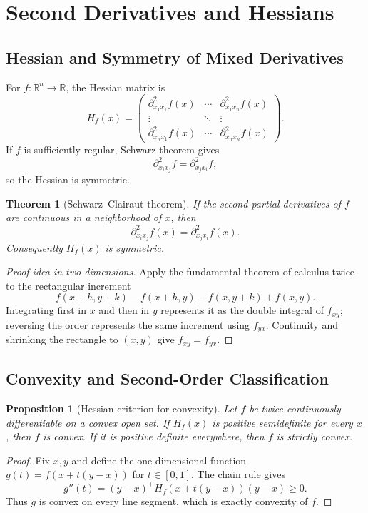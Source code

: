 \documentclass[11pt]{article}
\newcommand{\R}{\mathbb{R}}
\theoremstyle{definition}
\theoremstyle{plain}
\newtheorem{theorem}[definition]{Theorem}
\newtheorem{proposition}[definition]{Proposition}
\theoremstyle{remark}
\begin{document}
\section{Second Derivatives and Hessians}

\subsection{Hessian and Symmetry of Mixed Derivatives}

For $f:\R^n\to\R$, the Hessian matrix is
\[
H_f(x)=
\begin{pmatrix}
\partial_{x_1x_1}^2f(x)&\cdots&\partial_{x_1x_n}^2f(x)\\
\vdots&\ddots&\vdots\\
\partial_{x_nx_1}^2f(x)&\cdots&\partial_{x_nx_n}^2f(x)
\end{pmatrix}.
\]
If $f$ is sufficiently regular, Schwarz theorem gives
\[
\partial_{x_ix_j}^2f=\partial_{x_jx_i}^2f,
\]
so the Hessian is symmetric.

\begin{theorem}[Schwarz--Clairaut theorem]
If the second partial derivatives of $f$ are continuous in a neighborhood of
$x$, then
\[
\partial_{x_ix_j}^2f(x)=\partial_{x_jx_i}^2f(x).
\]
Consequently $H_f(x)$ is symmetric.
\end{theorem}

\begin{proof}[Proof idea in two dimensions]
Apply the fundamental theorem of calculus twice to the rectangular increment
\[
f(x+h,y+k)-f(x+h,y)-f(x,y+k)+f(x,y).
\]
Integrating first in $x$ and then in $y$ represents it as the double integral
of $f_{xy}$; reversing the order represents the same increment using $f_{yx}$.
Continuity and shrinking the rectangle to $(x,y)$ give $f_{xy}=f_{yx}$.
\end{proof}

\subsection{Convexity and Second-Order Classification}

\begin{proposition}[Hessian criterion for convexity]
Let $f$ be twice continuously differentiable on a convex open set. If
$H_f(x)$ is positive semidefinite for every $x$, then $f$ is convex. If it is
positive definite everywhere, then $f$ is strictly convex.
\end{proposition}

\begin{proof}
Fix $x,y$ and define the one-dimensional function
$g(t)=f(x+t(y-x))$ for $t\in[0,1]$. The chain rule gives
\[
g''(t)=(y-x)^\top H_f(x+t(y-x))(y-x)\geq0.
\]
Thus $g$ is convex on every line segment, which is exactly convexity of $f$.
\end{proof}
\end{document}
